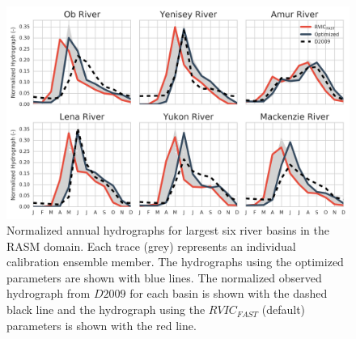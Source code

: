\documentclass[jgrga, draft]{agutex}
\begin{document}
\clearpage
\begin{figure}
\noindent\includegraphics[width=35pc,natwidth=1]{calibration_hydrographs}
\caption{Normalized annual hydrographs for largest six river basins in the RASM domain.
Each trace (grey) represents an individual calibration ensemble member.
The hydrographs using the optimized parameters are shown with blue lines.
The normalized observed hydrograph from $D2009$ for each basin is shown with the dashed black line and the hydrograph using the $RVIC_{FAST}$ (default) parameters is shown with the red line.}
\label{fig:calibration_hydrographs}
\end{figure}
\end{document}
